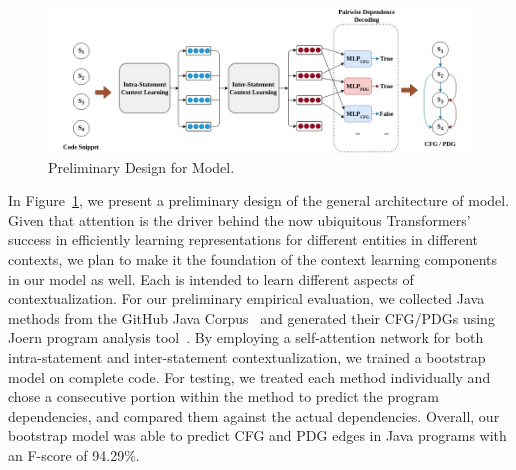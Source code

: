 
\begin{figure}[ht]
\begin{center}
    \includegraphics[width=\textwidth]{model-abstract.jpg}
    \caption{Preliminary Design for \tool Model.}
    \label{fig:model}
    \vspace{-12pt}
\end{center}
\end{figure}

In Figure~\ref{fig:model}, we present a preliminary design of the general architecture of \tool model. Given that attention is the driver behind the now ubiquitous Transformers’~\cite{Vaswani-2017} success in efficiently learning representations for different entities in different contexts, we plan to make it the foundation of the context learning components in our model as well. Each is intended to learn different aspects of contextualization. For our preliminary empirical evaluation, we collected Java methods from the GitHub Java Corpus~\cite{githubCorpus2013} and generated their CFG/PDGs using Joern program analysis tool~\cite{joern-2014}. By employing a self-attention network for both intra-statement and inter-statement contextualization, we trained a bootstrap model on complete code. For testing, we treated each method individually and chose a consecutive portion within the method to predict the program dependencies, and compared them against the actual dependencies. Overall, our bootstrap model was able to predict CFG and PDG edges in Java programs with an F-score of 94.29\%.
